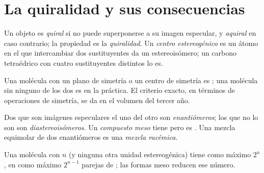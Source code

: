 \section{La quiralidad y sus consecuencias}

\begin{definition}\label{def:b1:stereochemistry-in-depth:stereocentre}
Un objeto es \emph{quiral} si no puede superponerse a su
imagen especular, y \emph{aquiral} en caso contrario; la
propiedad es la \emph{quiralidad}. Un \emph{centro
estereogénico} es un átomo en el que intercambiar
dos sustituyentes da un estereoisómero; un carbono tetraédrico con cuatro
sustituyentes distintos lo es.
\end{definition}

Una molécula con un plano de simetría o un centro de simetría es ;
una molécula sin ninguno de los dos es  en la práctica. El criterio
exacto, en términos de operaciones de simetría, se da en el volumen del
tercer año.

\begin{definition}\label{def:b1:stereochemistry-in-depth:enantiomers}
Dos  que son imágenes especulares el uno del otro son
\emph{enantiómeros}; los  que no lo son son
\emph{diastereoisómeros}. Un \emph{compuesto
meso} tiene  pero es .
Una mezcla equimolar de dos enantiómeros es una \emph{mezcla
racémica}.
\end{definition}

\begin{proposition}\label{prop:b1:stereochemistry-in-depth:max-stereoisomers}
Una molécula con $n$  (y ninguna otra unidad
estereogénica) tiene como máximo $2^n$ , en como máximo
$2^{n-1}$ parejas de ; las formas meso reducen ese número.
\end{proposition}

